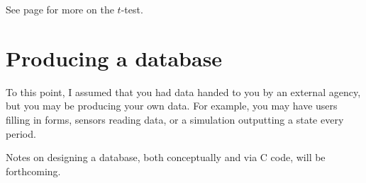 See page \pageref{ttest} for more on the $t$-test.

\section{Producing a database} To this point, I assumed that you had
data handed to you by an external agency, but you may be producing your
own data. For example, you may have users filling in forms, sensors
reading data, or a simulation outputting a state every period.

Notes on designing a database, both conceptually and via C code, will be
forthcoming. 

\setc %
